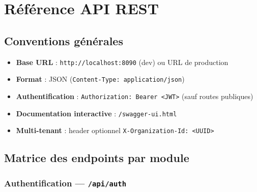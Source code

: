 \chapter{Référence API REST}

\section{Conventions générales}

\begin{itemize}[noitemsep]
  \item \textbf{Base URL} : \texttt{http://localhost:8090} (dev) ou URL de production
  \item \textbf{Format} : JSON (\texttt{Content-Type: application/json})
  \item \textbf{Authentification} : \texttt{Authorization: Bearer <JWT>} (sauf routes publiques)
  \item \textbf{Documentation interactive} : \texttt{/swagger-ui.html}
  \item \textbf{Multi-tenant} : header optionnel \texttt{X-Organization-Id: <UUID>}
\end{itemize}

\section{Matrice des endpoints par module}

\subsection{Authentification — \texttt{/api/auth}}

